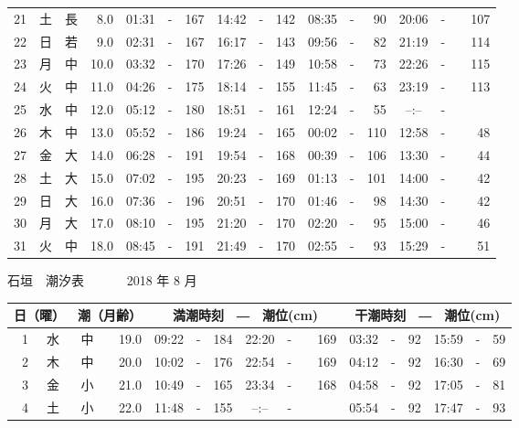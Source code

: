 \documentclass[12pt.a4j]{jsarticle}
\begin{document}
\begin{center}
\begin{table}[ht]
\begin{tabular}{|rc|cr|ccrccr|ccrccr|}
21 & 土 & 長 &  8.0 &  01:31 &-& 167  &  14:42 &-& 142  &   08:35 &-&  90  &   20:06 &-& 107  \\
22 & 日 & 若 &  9.0 &  02:31 &-& 167  &  16:17 &-& 143  &   09:56 &-&  82  &   21:19 &-& 114  \\
23 & 月 & 中 & 10.0 &  03:32 &-& 170  &  17:26 &-& 149  &   10:58 &-&  73  &   22:26 &-& 115  \\
24 & 火 & 中 & 11.0 &  04:26 &-& 175  &  18:14 &-& 155  &   11:45 &-&  63  &   23:19 &-& 113  \\
25 & 水 & 中 & 12.0 &  05:12 &-& 180  &  18:51 &-& 161  &   12:24 &-&  55  &   --:-- &-&~~~~~ \\
26 & 木 & 中 & 13.0 &  05:52 &-& 186  &  19:24 &-& 165  &   00:02 &-& 110  &   12:58 &-&  48  \\
27 & 金 & 大 & 14.0 &  06:28 &-& 191  &  19:54 &-& 168  &   00:39 &-& 106  &   13:30 &-&  44  \\
28 & 土 & 大 & 15.0 &  07:02 &-& 195  &  20:23 &-& 169  &   01:13 &-& 101  &   14:00 &-&  42  \\
29 & 日 & 大 & 16.0 &  07:36 &-& 196  &  20:51 &-& 170  &   01:46 &-&  98  &   14:30 &-&  42  \\
30 & 月 & 大 & 17.0 &  08:10 &-& 195  &  21:20 &-& 170  &   02:20 &-&  95  &   15:00 &-&  46  \\
31 & 火 & 中 & 18.0 &  08:45 &-& 191  &  21:49 &-& 170  &   02:55 &-&  93  &   15:29 &-&  51  \\
   \hline
   \end{tabular}
\end{table}
\newpage
 {\LARGE 石垣　潮汐表　　　}
 {\large 2018 年  8 月}\\
 \begin{table}[ht]
    \begin{tabular}{|rc|cr|ccrccr|ccrccr|}
    \hline
    \multicolumn{2}{|c|}{日（曜）} & \multicolumn{2}{c|}{潮（月齢）} & \multicolumn{6}{c|}{満潮時刻　―　潮位(cm)} & \multicolumn{6}{c|}{干潮時刻　―　潮位(cm)} \\
 \hline
 1 & 水 & 中 & 19.0 &  09:22 &-& 184  &  22:20 &-& 169  &   03:32 &-&  92  &   15:59 &-&  59  \\
 2 & 木 & 中 & 20.0 &  10:02 &-& 176  &  22:54 &-& 169  &   04:12 &-&  92  &   16:30 &-&  69  \\
 3 & 金 & 小 & 21.0 &  10:49 &-& 165  &  23:34 &-& 168  &   04:58 &-&  92  &   17:05 &-&  81  \\
 4 & 土 & 小 & 22.0 &  11:48 &-& 155  &  --:-- &-&~~~~~ &   05:54 &-&  92  &   17:47 &-&  93  \\

\end{tabular}
\end{table}
\end{center}
\end{document}
